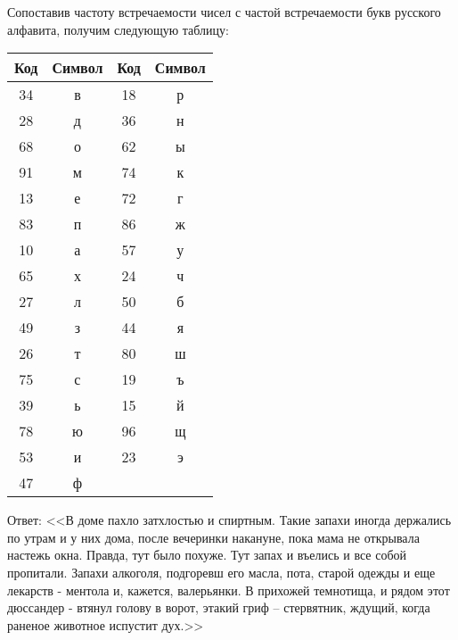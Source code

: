 Сопоставив частоту встречаемости чисел с частой встречаемости букв русского алфавита, получим следующую таблицу:

\begin{table}[H]
	\centering
	\begin{tabular}{|c|c|c|c|}
				\hline
				Код & Символ & Код & Символ \\ \hline
				34 & в & 18 & р \\ \hline
				28 & д & 36 & н \\ \hline
				68 & о & 62 & ы \\ \hline
				91 & м & 74 & к \\ \hline
				13 & е & 72 & г \\ \hline
				83 & п & 86 & ж \\ \hline
				10 & а & 57 & у \\ \hline
				65 & х & 24 & ч \\ \hline
				27 & л & 50 & б \\ \hline
				49 & з & 44 & я \\ \hline
				26 & т & 80 & ш \\ \hline
				75 & с & 19 & ъ \\ \hline
				39 & ь & 15 & й \\ \hline
				78 & ю & 96 & щ \\ \hline
				53 & и & 23 & э \\ \hline
				47 & ф & & \\ \hline
	\end{tabular}
\end{table}

Ответ: <<В доме пахло затхлостью и спиртным. Такие запахи иногда держались по утрам и у них дома, после вечеринки накануне, пока
мама не открывала настежь окна. Правда, тут было похуже. Тут запах и въелись и все собой пропитали. Запахи алкоголя, подгоревш
его масла, пота, старой одежды и еще лекарств - ментола и, кажется, валерьянки. В прихожей темнотища, и рядом этот дюссандер - втянул голову в ворот, этакий гриф – стервятник, ждущий, когда раненое животное испустит дух.>>




